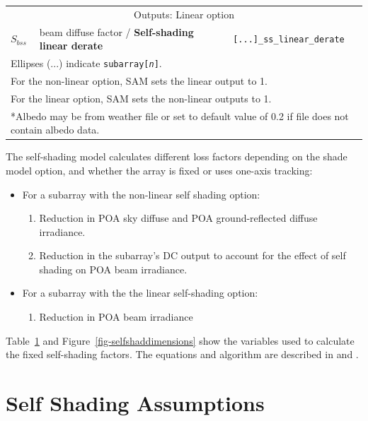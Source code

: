 \documentclass[12pt,letterpaper]{article}
\begin{document}
\begin{table}
\begin{center}
\begin{tabular}{lll}
\midrule
\multicolumn{3}{c}{Outputs: Linear option}\\
$S_{bss}$ & beam diffuse factor  / \textbf{Self-shading linear derate}& \texttt{[...]\_ss\_linear\_derate}\\
\midrule
\multicolumn{3}{l}{Ellipses (...) indicate \texttt{subarray[\textit{n}]}.}\\
\multicolumn{3}{l}{For the non-linear option, SAM sets the linear output to 1.}\\
\multicolumn{3}{l}{For the linear option, SAM sets the non-linear outputs to 1.}\\
\multicolumn{3}{l}{*Albedo may be from weather file or set to default value of 0.2 if file does not contain albedo data.}\\
\end{tabular}
\label{tab-selfshadinputs}
\end{center}
\end{table}

The self-shading model calculates different loss factors depending on the shade model option, and whether the array is fixed or uses one-axis tracking:

\begin{itemize}
\item For a subarray with the non-linear self shading option:
\begin{enumerate}
\item Reduction in POA sky diffuse and POA ground-reflected diffuse irradiance.
\item Reduction in the subarray's DC output to account for the effect of self shading on POA beam irradiance.
\end{enumerate}
\item For a subarray with the the linear self-shading option:
\begin{enumerate}
\item Reduction in POA beam irradiance
\end{enumerate}
\end{itemize}

Table~\ref{tab-selfshadinputs} and Figure~\ref{fig-selfshaddimensions} show the variables used to calculate the fixed self-shading factors. The equations and algorithm are described in \citep{appelbaum1979} and \citep{deline2013a}.

\section{Self Shading Assumptions}\label{sec-selfshadassumptions}
\end{document}
